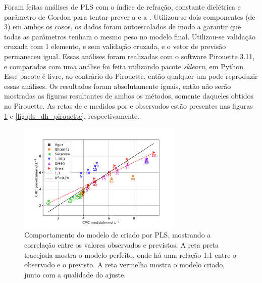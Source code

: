 		Foram feitas análises de PLS  com o índice de refração, constante dielétrica e parâmetro de Gordon para tentar prever a \cmc{} e a \DHmic. Utilizou-se dois componentes (de 3) em ambos os casos, os dados foram autoescalados de modo a garantir que todas as parâmetros tenham o mesmo peso no modelo final. Utilizou-se validação cruzada com 1 elemento, e sem validação cruzada, e o vetor de previsão permaneceu igual. Essas análises foram realizadas com o software Pirouette 3.11, e comparadas com uma análise foi feita utilizando pacote \emph{sklearn}, em Python. Esse pacote é livre, ao contrário do Pirouette, então qualquer um pode reproduzir essas análises. Os resultados foram absolutamente iguais, então não serão mostradas as figuras resultantes de ambos os métodos, somente daqueles obtidos no Pirouette. As retas de \cmc{} e \DHmic{} medidos por \cmc{} e \DHmic{} observados estão presentes nas figuras \ref{fig:pls_cmc_pirouette} e \ref{fig:pls_dh_pirouette}, respectivamente.
		
		\begin{figure}[h]
			\centering
			\includegraphics[width=0.7\textwidth]{imagens/itc/PLS_cmc_pirouette}
			\caption{Comportamento do modelo de \cmc{} criado por PLS, mostrando a correlação entre os valores observados e previstos. A reta preta tracejada mostra o modelo perfeito, onde há uma relação 1:1 entre o observado e o previsto. A reta vermelha mostra o modelo criado, junto com a qualidade do ajuste.}
			\label{fig:pls_cmc_pirouette}
		\end{figure}
	
